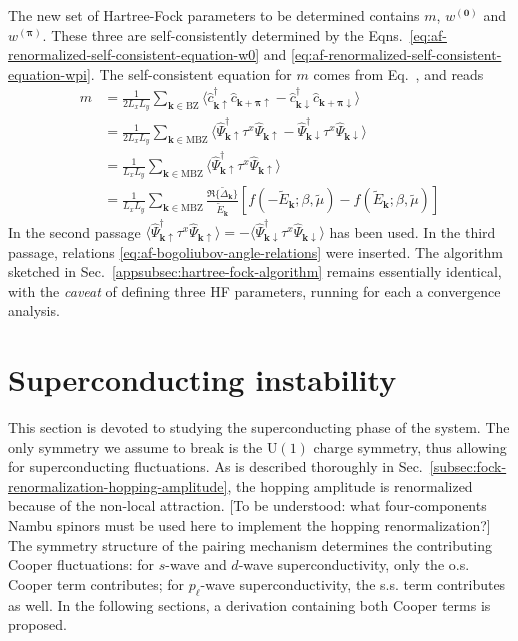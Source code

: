 The new set of Hartree-Fock parameters to be determined contains $m$, $w^{(\mathbf{0})}$ and $w^{(\bm{\pi})}$. These three are self-consistently determined by the Eqns.~\eqref{eq:af-renormalized-self-consistent-equation-w0} and \eqref{eq:af-renormalized-self-consistent-equation-wpi}. The self-consistent equation for $m$ comes from Eq.~\mref, and reads
\begin{align}
	m &= \frac{1}{2L_xL_y} \sum_{\mathbf{k} \in \mathrm{BZ}} \langle
		\hat c_{\mathbf{k}\uparrow}^\dagger  \hat c_{\mathbf{k}+\bm{\pi}\uparrow} - \hat c_{\mathbf{k}\downarrow}^\dagger  \hat c_{\mathbf{k}+\bm{\pi}\downarrow}
	\rangle \nonumber \\
	&= \frac{1}{2L_xL_y} \sum_{\mathbf{k} \in \mathrm{MBZ}} \langle
		\hat \Psi_{\mathbf{k}\uparrow}^\dagger \tau^x \hat \Psi_{\mathbf{k}\uparrow} - \hat \Psi_{\mathbf{k}\downarrow}^\dagger \tau^x \hat \Psi_{\mathbf{k}\downarrow}
	\rangle \nonumber \\
	&= \frac{1}{L_xL_y} \sum_{\mathbf{k} \in \mathrm{MBZ}} \langle
		\hat \Psi_{\mathbf{k}\uparrow}^\dagger \tau^x \hat \Psi_{\mathbf{k}\uparrow}
	\rangle \nonumber \\
	&= \frac{1}{L_xL_y} \sum_{\mathbf{k} \in \mathrm{MBZ}} \frac{\Re\{\tilde{\Delta}_\mathbf{k}\}}{\tilde{E}_\mathbf{k}} \left[
		f\left(
			-\tilde{E}_\mathbf{k};\beta,\tilde{\mu}
		\right) - f\left(
			\tilde{E}_\mathbf{k};\beta,\tilde{\mu}
		\right)
	\right]
	\label{eq:af-renormalized-self-consistent-equation-m}
\end{align}
In the second passage $\langle \hat \Psi_{\mathbf{k}\uparrow}^\dagger \tau^x \hat \Psi_{\mathbf{k}\uparrow} \rangle = - \langle \hat \Psi_{\mathbf{k}\downarrow}^\dagger \tau^x \hat \Psi_{\mathbf{k}\downarrow} \rangle$ has been used. In the third passage, relations \eqref{eq:af-bogoliubov-angle-relations} were inserted. The algorithm sketched in Sec.~\ref{appsubsec:hartree-fock-algorithm} remains essentially identical, with the \textit{caveat} of defining three HF parameters, running for each a convergence analysis.

\section{Superconducting instability}

This section is devoted to studying the superconducting phase of the system. The only symmetry we assume to break is the $\mathrm{U}(1)$ charge symmetry, thus allowing for superconducting fluctuations. 
{\color{tabred}
	As is described thoroughly in Sec.~\ref{subsec:fock-renormalization-hopping-amplitude}, the hopping amplitude is renormalized because of the non-local attraction. [To be understood: what four-components Nambu spinors must be used here to implement the hopping renormalization?]
}
The symmetry structure of the pairing mechanism determines the contributing Cooper fluctuations: for $s$-wave and $d$-wave superconductivity, only the o.s. Cooper term contributes; for $p_\ell$-wave superconductivity, the s.s. term contributes as well. In the following sections, a derivation containing both Cooper terms is proposed.

